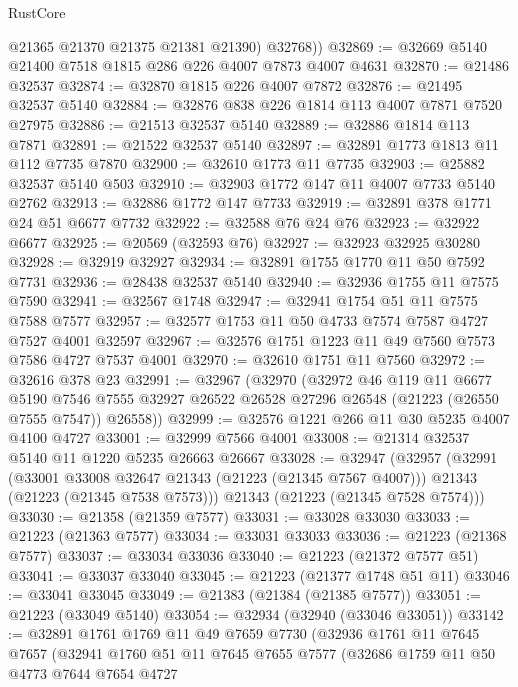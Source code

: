 \begin{lexlean}{RustCore}
\begin{coremodule}
          @21365
          @21370
          @21375
          @21381
          @21390)
        @32768))
@32869 := @32669 @5140 @21400 @7518 @1815 @286 @226 @4007 @7873 @4007 @4631
@32870 := @21486 @32537
@32874 := @32870 @1815 @226 @4007 @7872
@32876 := @21495 @32537 @5140
@32884 := @32876 @838 @226 @1814 @113 @4007 @7871 @7520 @27975
@32886 := @21513 @32537 @5140
@32889 := @32886 @1814 @113 @7871
@32891 := @21522 @32537 @5140
@32897 := @32891 @1773 @1813 @11 @112 @7735 @7870
@32900 := @32610 @1773 @11 @7735
@32903 := @25882 @32537 @5140 @503
@32910 := @32903 @1772 @147 @11 @4007 @7733 @5140 @2762
@32913 := @32886 @1772 @147 @7733
@32919 := @32891 @378 @1771 @24 @51 @6677 @7732
@32922 := @32588 @76 @24 @76
@32923 := @32922 @6677
@32925 := @20569 (@32593 @76)
@32927 := @32923 @32925 @30280
@32928 := @32919 @32927
@32934 := @32891 @1755 @1770 @11 @50 @7592 @7731
@32936 := @28438 @32537 @5140
@32940 := @32936 @1755 @11 @7575 @7590
@32941 := @32567 @1748
@32947 := @32941 @1754 @51 @11 @7575 @7588 @7577
@32957 := @32577 @1753 @11 @50 @4733 @7574 @7587 @4727 @7527 @4001 @32597
@32967 := @32576 @1751 @1223 @11 @49 @7560 @7573 @7586 @4727 @7537 @4001
@32970 := @32610 @1751 @11 @7560
@32972 := @32616 @378 @23
@32991 := @32967
    (@32970
      (@32972
        @46
        @119
        @11
        @6677
        @5190
        @7546
        @7555
        @32927
        @26522
        @26528
        @27296
        @26548
        (@21223 (@26550 @7555 @7547))
        @26558))
@32999 := @32576 @1221 @266 @11 @30 @5235 @4007 @4100 @4727
@33001 := @32999 @7566 @4001
@33008 := @21314 @32537 @5140 @11 @1220 @5235 @26663 @26667
@33028 := @32947
    (@32957
      (@32991
        (@33001 @33008 @32647 @21343 (@21223 (@21345 @7567 @4007)))
        @21343
        (@21223 (@21345 @7538 @7573)))
      @21343
      (@21223 (@21345 @7528 @7574)))
@33030 := @21358 (@21359 @7577)
@33031 := @33028 @33030
@33033 := @21223 (@21363 @7577)
@33034 := @33031 @33033
@33036 := @21223 (@21368 @7577)
@33037 := @33034 @33036
@33040 := @21223 (@21372 @7577 @51)
@33041 := @33037 @33040
@33045 := @21223 (@21377 @1748 @51 @11)
@33046 := @33041 @33045
@33049 := @21383 (@21384 (@21385 @7577))
@33051 := @21223 (@33049 @5140)
@33054 := @32934 (@32940 (@33046 @33051))
@33142 := @32891
    @1761
    @1769
    @11
    @49
    @7659
    @7730
    (@32936
      @1761
      @11
      @7645
      @7657
      (@32941
        @1760
        @51
        @11
        @7645
        @7655
        @7577
        (@32686
          @1759
          @11
          @50
          @4773
          @7644
          @7654
          @4727

\end{coremodule}
\end{lexlean}
